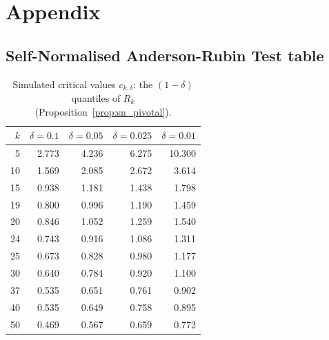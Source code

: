 \section{Appendix}

\subsection{Self-Normalised Anderson-Rubin Test table}
\label{sec:artable}

\begin{table}[htbp]
\centering
\caption{Simulated critical values $c_{k,\delta}$: the $(1-\delta)$ quantiles of $R_k$ (Proposition~\ref{prop:sn_pivotal}).}
\label{tab:rk_critical_values}
\begin{tabular}{rrrrr}
\toprule
$k$ & $\delta=0.1$ & $\delta=0.05$ & $\delta=0.025$ & $\delta=0.01$ \\
\midrule
5 & 2.773 & 4.236 & 6.275 & 10.300 \\
10 & 1.569 & 2.085 & 2.672 & 3.614 \\
15 & 0.938 & 1.181 & 1.438 & 1.798 \\
19 & 0.800 & 0.996 & 1.190 & 1.459 \\
20 & 0.846 & 1.052 & 1.259 & 1.540 \\
24 & 0.743 & 0.916 & 1.086 & 1.311 \\
25 & 0.673 & 0.828 & 0.980 & 1.177 \\
30 & 0.640 & 0.784 & 0.920 & 1.100 \\
37 & 0.535 & 0.651 & 0.761 & 0.902 \\
40 & 0.535 & 0.649 & 0.758 & 0.895 \\
50 & 0.469 & 0.567 & 0.659 & 0.772 \\
\bottomrule
\end{tabular}
\end{table}
